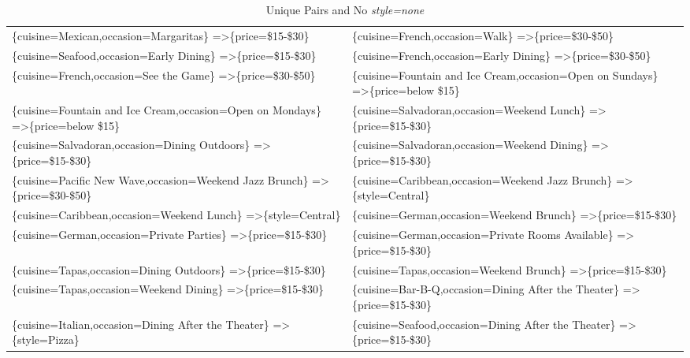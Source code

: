 \documentclass[letterpaper,10pt]{article}
\begin{document}
\begin{appendices}
\begin{table}[h]
\begin{adjustbox}{max width=\textwidth}
\begin{tabular}{ll}
\end{tabular}
\end{adjustbox}
\end{table}
\begin{table}[h]
\caption*{Unique Pairs and No \textit{style=none}}
\begin{adjustbox}{max width=\textwidth}
\begin{tabular}{ll}
\{cuisine=Mexican,occasion=Margaritas\} =\textgreater \{price=\$15-\$30\} & \{cuisine=French,occasion=Walk\} =\textgreater \{price=\$30-\$50\} \\ 
\{cuisine=Seafood,occasion=Early Dining\} =\textgreater \{price=\$15-\$30\} & \{cuisine=French,occasion=Early Dining\} =\textgreater \{price=\$30-\$50\} \\ 
\{cuisine=French,occasion=See the Game\} =\textgreater \{price=\$30-\$50\} & \{cuisine=Fountain and Ice Cream,occasion=Open on Sundays\} =\textgreater \{price=below \$15\} \\ 
\{cuisine=Fountain and Ice Cream,occasion=Open on Mondays\} =\textgreater \{price=below \$15\} & \{cuisine=Salvadoran,occasion=Weekend Lunch\} =\textgreater \{price=\$15-\$30\} \\ 
\{cuisine=Salvadoran,occasion=Dining Outdoors\} =\textgreater \{price=\$15-\$30\} & \{cuisine=Salvadoran,occasion=Weekend Dining\} =\textgreater \{price=\$15-\$30\} \\ 
\{cuisine=Pacific New Wave,occasion=Weekend Jazz Brunch\} =\textgreater \{price=\$30-\$50\} & \{cuisine=Caribbean,occasion=Weekend Jazz Brunch\} =\textgreater \{style=Central\} \\ 
\{cuisine=Caribbean,occasion=Weekend Lunch\} =\textgreater \{style=Central\} & \{cuisine=German,occasion=Weekend Brunch\} =\textgreater \{price=\$15-\$30\} \\ 
\{cuisine=German,occasion=Private Parties\} =\textgreater \{price=\$15-\$30\} & \{cuisine=German,occasion=Private Rooms Available\} =\textgreater \{price=\$15-\$30\} \\ 
\{cuisine=Tapas,occasion=Dining Outdoors\} =\textgreater \{price=\$15-\$30\} & \{cuisine=Tapas,occasion=Weekend Brunch\} =\textgreater \{price=\$15-\$30\} \\ 
\{cuisine=Tapas,occasion=Weekend Dining\} =\textgreater \{price=\$15-\$30\} & \{cuisine=Bar-B-Q,occasion=Dining After the Theater\} =\textgreater \{price=\$15-\$30\} \\ 
\{cuisine=Italian,occasion=Dining After the Theater\} =\textgreater \{style=Pizza\} & \{cuisine=Seafood,occasion=Dining After the Theater\} =\textgreater \{price=\$15-\$30\} \\ 

\end{tabular}
\end{adjustbox}
\end{table}
\end{appendices}
\end{document}
